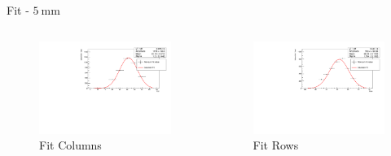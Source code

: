 \begin{frame}{ Fit - $\SI{5}{\milli\meter}$ }
  \begin{columns}

   \begin{column}{0.48\textwidth}
     \begin{figure}
       \centering
       \includegraphics[width=1.05\textwidth]{./5_mm_erorbar_plot_col.pdf}
       \caption{ Fit Columns }
       \label{ fig: iv_curve_theoretical}
     \end{figure}
   \end{column}

   \begin{column}{0.48\textwidth}
     \begin{figure}
       \centering
       \includegraphics[width=1.05\textwidth]{./5_mm_erorbar_plot_row.pdf}
       \caption{ Fit Rows }
       \label{ fig: iv_curve_measured}
     \end{figure}
   \end{column}

  \end{columns}

\end{frame}

